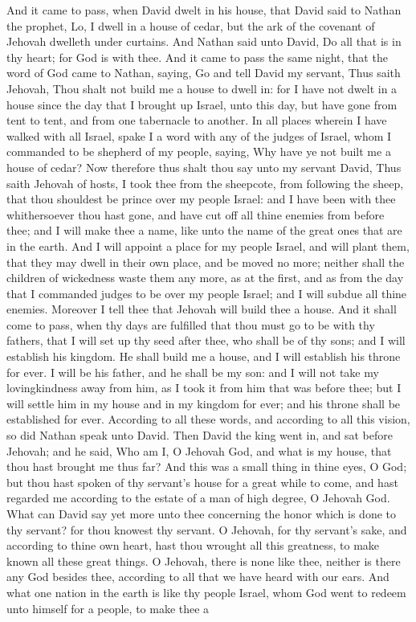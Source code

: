 And it came to pass, when David dwelt in his house, that David said to Nathan the prophet, Lo, I dwell in a house of cedar, but the ark of the covenant of Jehovah dwelleth under curtains. And Nathan said unto David, Do all that is in thy heart; for God is with thee. And it came to pass the same night, that the word of God came to Nathan, saying, Go and tell David my servant, Thus saith Jehovah, Thou shalt not build me a house to dwell in: for I have not dwelt in a house since the day that I brought up Israel, unto this day, but have gone from tent to tent, and from one tabernacle to another. In all places wherein I have walked with all Israel, spake I a word with any of the judges of Israel, whom I commanded to be shepherd of my people, saying, Why have ye not built me a house of cedar? Now therefore thus shalt thou say unto my servant David, Thus saith Jehovah of hosts, I took thee from the sheepcote, from following the sheep, that thou shouldest be prince over my people Israel: and I have been with thee whithersoever thou hast gone, and have cut off all thine enemies from before thee; and I will make thee a name, like unto the name of the great ones that are in the earth. And I will appoint a place for my people Israel, and will plant them, that they may dwell in their own place, and be moved no more; neither shall the children of wickedness waste them any more, as at the first, and as from the day that I commanded judges to be over my people Israel; and I will subdue all thine enemies. Moreover I tell thee that Jehovah will build thee a house. And it shall come to pass, when thy days are fulfilled that thou must go to be with thy fathers, that I will set up thy seed after thee, who shall be of thy sons; and I will establish his kingdom. He shall build me a house, and I will establish his throne for ever. I will be his father, and he shall be my son: and I will not take my lovingkindness away from him, as I took it from him that was before thee; but I will settle him in my house and in my kingdom for ever; and his throne shall be established for ever. According to all these words, and according to all this vision, so did Nathan speak unto David.  Then David the king went in, and sat before Jehovah; and he said, Who am I, O Jehovah God, and what is my house, that thou hast brought me thus far? And this was a small thing in thine eyes, O God; but thou hast spoken of thy servant’s house for a great while to come, and hast regarded me according to the estate of a man of high degree, O Jehovah God. What can David say yet more unto thee concerning the honor which is done to thy servant? for thou knowest thy servant. O Jehovah, for thy servant’s sake, and according to thine own heart, hast thou wrought all this greatness, to make known all these great things. O Jehovah, there is none like thee, neither is there any God besides thee, according to all that we have heard with our ears. And what one nation in the earth is like thy people Israel, whom God went to redeem unto himself for a people, to make thee a 